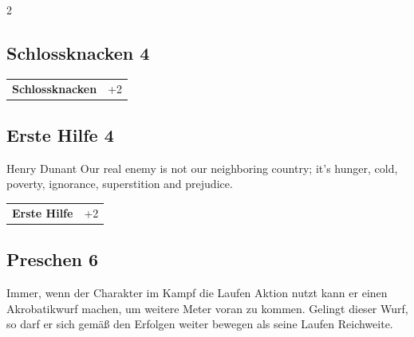 \begin{multicols}{2}
\begin{tcolorbox}

\end{tcolorbox}

\begin{tcolorbox}
    \subsection*{Schlossknacken \hfill \small{4 }}
    \tcblower




\begin{tabular}{@{}ll@{}}
    \textbf{Schlossknacken} & +2\\
\end{tabular}


\end{tcolorbox}

\begin{tcolorbox}
    \subsection*{Erste Hilfe \hfill \small{4 }}
    \tcblower


\begin{pquote}{Henry Dunant}
Our real enemy is not our neighboring country; it's hunger, cold, poverty, ignorance, superstition and prejudice.
\end{pquote}

\vspace{3mm}

\begin{tabular}{@{}ll@{}}
    \textbf{Erste Hilfe} & +2\\
\end{tabular}


\end{tcolorbox}

\begin{tcolorbox}
    \subsection*{Preschen \hfill \small{6 }}
    \tcblower
Immer, wenn der Charakter im Kampf die Laufen Aktion nutzt kann er einen Akrobatikwurf machen, um weitere Meter voran zu kommen. Gelingt dieser Wurf, so darf er sich gemäß den Erfolgen weiter bewegen als seine Laufen Reichweite. 


\end{tcolorbox}
\end{multicols}
